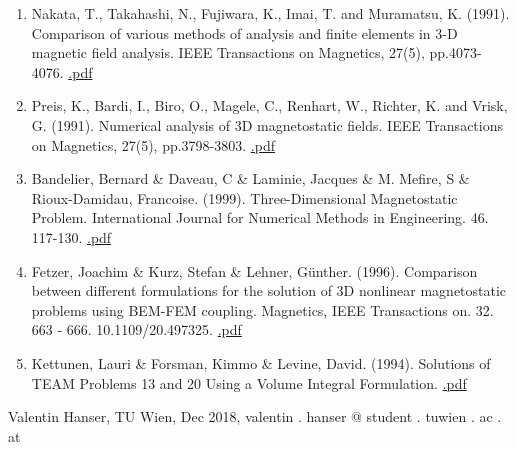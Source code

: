 \documentclass[11pt]{article}
\providecommand{\tightlist}{%
      \setlength{\itemsep}{0pt}\setlength{\parskip}{0pt}}
\begin{document}
\begin{enumerate}
\def\labelenumi{\arabic{enumi}.}
\tightlist
\item
  Nakata, T., Takahashi, N., Fujiwara, K., Imai, T. and Muramatsu, K.
  (1991). Comparison of various methods of analysis and finite elements
  in 3-D magnetic field analysis. IEEE Transactions on Magnetics, 27(5),
  pp.4073-4076.
  \href{https://ieeexplore.ieee.org/stamp/stamp.jsp?tp=\&arnumber=104996}{.pdf}
\item
  Preis, K., Bardi, I., Biro, O., Magele, C., Renhart, W., Richter, K.
  and Vrisk, G. (1991). Numerical analysis of 3D magnetostatic fields.
  IEEE Transactions on Magnetics, 27(5), pp.3798-3803.
  \href{https://ieeexplore.ieee.org/stamp/stamp.jsp?tp=\&arnumber=123863}{.pdf}
\item
  Bandelier, Bernard \& Daveau, C \& Laminie, Jacques \& M. Mefire, S \&
  Rioux-Damidau, Francoise. (1999). Three-Dimensional Magnetostatic
  Problem. International Journal for Numerical Methods in Engineering.
  46. 117-130.
  \href{http://citeseerx.ist.psu.edu/viewdoc/download?doi=10.1.1.595.7033\&rep=rep1\&type=pdf}{.pdf}
\item
  Fetzer, Joachim \& Kurz, Stefan \& Lehner, Günther. (1996). Comparison
  between different formulations for the solution of 3D nonlinear
  magnetostatic problems using BEM-FEM coupling. Magnetics, IEEE
  Transactions on. 32. 663 - 666. 10.1109/20.497325.
  \href{https://ieeexplore.ieee.org/ielx5/20/10597/00497325.pdf?tp=\&arnumber=497325\&isnumber=10597}{.pdf}
\item
  Kettunen, Lauri \& Forsman, Kimmo \& Levine, David. (1994). Solutions
  of TEAM Problems 13 and 20 Using a Volume Integral Formulation.
  \href{https://www.researchgate.net/profile/Lauri_Kettunen/publication/2756884_Solutions_of_TEAM_Problems_13_and_20_Using_a_Volume_Integral_Formulation/links/09e4150c73dd3c8a38000000/Solutions-of-TEAM-Problems-13-and-20-Using-a-Volume-Integral-Formulation.pdf}{.pdf}
\end{enumerate}

    Valentin Hanser, TU Wien, Dec 2018, valentin . hanser @ student . tuwien
. ac . at


    
    
    
    
\end{document}
